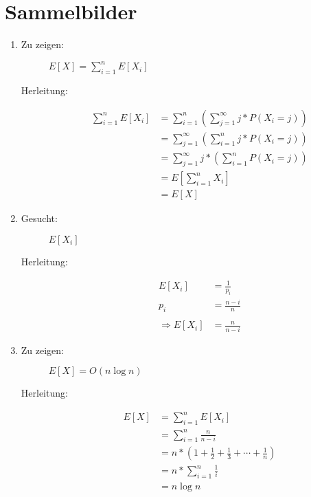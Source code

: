 \documentclass[a4paper,10pt]{scrartcl}
\begin{document}
\section{Sammelbilder}
\begin{enumerate}
\item \begin{description}
		\item[Zu zeigen:] $E[X] = \sum\limits_{i = 1}^{n} E[X_{i}]$
		\item[Herleitung:]	\begin{align*}
								\sum\limits_{i = 1}^{n} E\left[X_{i}\right] &= \sum\limits_{i = 1}^{n}\left(\sum\limits_{j = 1}^{\infty}j * P\left(X_{i} = j\right)\right)\\
								&=\sum\limits_{j = 1}^{\infty}\left(\sum\limits_{i = 1}^{n}j * P\left(X_{i} = j\right)\right)\\
								&=\sum\limits_{j = 1}^{\infty}j * \left(\sum\limits_{i = 1}^{n}P\left(X_{i} = j\right)\right)\\
								&= E\left[\sum\limits_{i = 1}^{n}X_{i}\right]\\
								&= E\left[X\right]
							\end{align*}
	\end{description}

\item \begin{description}
		\item[Gesucht:] $E[X_{i}]$
		\item[Herleitung:] \begin{align*}
		E\left[X_{i}\right] &= \frac{1}{p_{i}}\\
		p_{i} &= \frac{n-i}{n}\\
		\\
		\Rightarrow E\left[X_{i}\right] &= \frac{n}{n-i}	
	\end{align*}\end{description}
\item \begin{description}
		\item[Zu zeigen:] $E[X] = O(n \log n)$ 
		\item[Herleitung:] \begin{align*}
		E\left[X\right] &= \sum\limits_{i = 1}^{n}E\left[X_{i}\right]\\
		&= \sum\limits_{i = 1}^{n}\frac{n}{n - i}\\
		&= n * \left(1 + \frac{1}{2} + \frac{1}{3} + \cdots + \frac{1}{n}\right)\\
		&= n * \sum\limits_{i = 1}^{n}\frac{1}{i}\\
		&= n \log n
	\end{align*}\end{description}
\end{enumerate}
\end{document}
